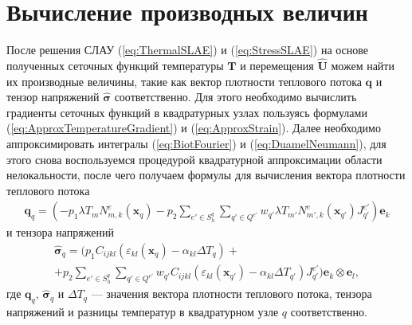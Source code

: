 \section{Вычисление производных величин}\label{sec:NumericalMethods/FluxStressCalculating}

После решения СЛАУ (\ref{eq:ThermalSLAE}) и (\ref{eq:StressSLAE}) на основе полученных сеточных функций температуры $\textbf{T}$ и перемещения $\widehat{\textbf{U}}$ можем найти их производные величины, такие как вектор плотности теплового потока $\boldsymbol{q}$ и тензор напряжений $\widehat{\boldsymbol{\sigma}}$ соответственно. Для этого необходимо вычислить градиенты сеточных функций в квадратурных узлах пользуясь формулами (\ref{eq:ApproxTemperatureGradient}) и (\ref{eq:ApproxStrain}). Далее необходимо аппроксимировать интегралы (\ref{eq:BiotFourier}) и (\ref{eq:DuamelNeumann}), для этого снова воспользуемся процедурой квадратурной аппроксимации области нелокальности, после чего получаем формулы для вычисления вектора плотности теплового потока
\begin{gather}
	\label{eq:ApproxFlux}
	\boldsymbol{q}_q = 
	\left(	
	-p_1 \lambda T_m N^e_{m,k} (\boldsymbol{x}_q)
	-p_2 \sum\limits_{e' \in S_h^q} \sum\limits_{q' \in Q^{e'}} w_{q'} \lambda T_{m'} N^e_{m',k} (\boldsymbol{x}_{q'}) J^{e'}_{q'}
	\right) \boldsymbol{e}_k
\end{gather}
и тензора напряжений
\begin{multline}
	\label{eq:ApproxStress}
	\widehat{\boldsymbol{\sigma}}_q =
	\Biggr(
	p_1 C_{ijkl} \left(\varepsilon_{kl} (\boldsymbol{x}_q) - \alpha_{kl} \Delta T_q \right)
	+\\+
	p_2 \sum\limits_{e' \in S_h^q} \sum\limits_{q' \in Q^{e'}} w_{q'} C_{ijkl} \left(\varepsilon_{kl} (\boldsymbol{x}_{q'}) - \alpha_{kl} \Delta T_{q'} \right) J^{e'}_{q'}
	\Biggr) \boldsymbol{e}_k \otimes \boldsymbol{e}_l,
\end{multline}
где $\boldsymbol{q}_q$, $\widehat{\boldsymbol{\sigma}}_q$ и $\Delta T_q$ --- значения вектора плотности теплового потока, тензора напряжений и разницы температур в квадратурном узле $q$ соответственно.

